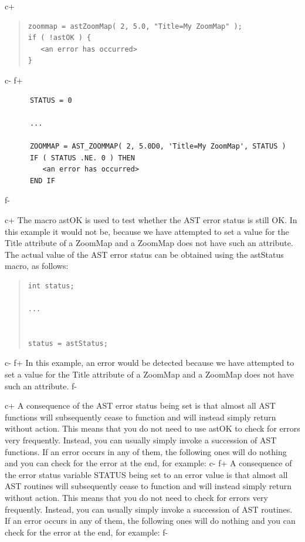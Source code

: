 \documentclass[twoside,11pt]{article}
\begin{document}
c+
\begin{quote}
\small
\begin{verbatim}
zoommap = astZoomMap( 2, 5.0, "Title=My ZoomMap" );
if ( !astOK ) {
   <an error has occurred>
}
\end{verbatim}
\normalsize
\end{quote}
c-
f+
\small
\begin{verbatim}
      STATUS = 0

      ...

      ZOOMMAP = AST_ZOOMMAP( 2, 5.0D0, 'Title=My ZoomMap', STATUS )
      IF ( STATUS .NE. 0 ) THEN
         <an error has occurred>
      END IF
\end{verbatim}
\normalsize
f-

c+
The macro astOK is used to test whether the AST error status is still
OK. In this example it would not be, because we have attempted to set
a value for the Title attribute of a ZoomMap and a ZoomMap does not
have such an attribute.  The actual value of the AST error status can
be obtained using the astStatus macro, as follows:

\begin{quote}
\small
\begin{verbatim}
int status;

...


status = astStatus;
\end{verbatim}
\normalsize
\end{quote}
c-
f+
In this example, an error would be detected because we have attempted
to set a value for the Title attribute of a ZoomMap and a ZoomMap does
not have such an attribute.
f-

c+
A consequence of the AST error status being set is that almost all AST
functions will subsequently cease to function and will instead simply
return without action.  This means that you do not need to use astOK
to check for errors very frequently. Instead, you can usually simply
invoke a succession of AST functions. If an error occurs in any of
them, the following ones will do nothing and you can check for the
error at the end, for example:
c-
f+
A consequence of the error status variable STATUS being set to an
error value is that almost all AST routines will subsequently cease to
function and will instead simply return without action.  This means
that you do not need to check for errors very frequently. Instead, you
can usually simply invoke a succession of AST routines. If an error
occurs in any of them, the following ones will do nothing and you can
check for the error at the end, for example:
f-
\end{document}

